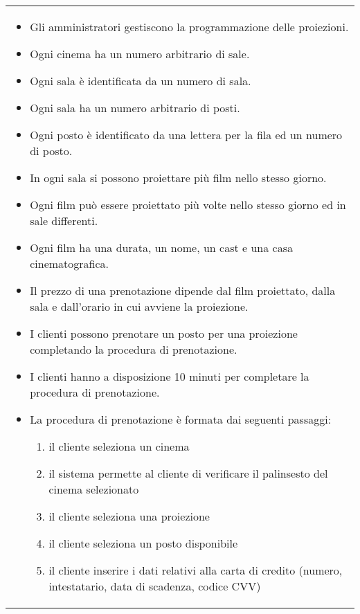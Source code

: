 \begin{tabularx}{\linewidth}{|X|}
    \hline
    \begin{itemize}
        \item Gli amministratori gestiscono la programmazione delle proiezioni.
        \item Ogni cinema ha un numero arbitrario di sale.
        \item Ogni sala è identificata da un numero di sala.
        \item Ogni sala ha un numero arbitrario di posti.
        \item Ogni posto è identificato da una lettera per la fila ed un numero
              di posto.
        \item In ogni sala si possono proiettare più film nello stesso giorno.
        \item Ogni film può essere proiettato più volte nello stesso giorno ed
              in sale differenti.
        \item Ogni film ha una durata, un nome, un cast e una
              casa cinematografica.
        \item Il prezzo di una prenotazione dipende dal film proiettato,
              dalla sala e dall'orario in cui avviene la proiezione.
        \item I clienti possono prenotare un posto per una proiezione
              completando la procedura di prenotazione.
        \item I clienti hanno a disposizione 10 minuti per completare la
              procedura di prenotazione.
        \item La procedura di prenotazione è formata dai seguenti passaggi:
              \begin{enumerate}
                  \item il cliente seleziona un cinema
                  \item il sistema permette al cliente di verificare
                        il palinsesto del cinema selezionato
                  \item il cliente seleziona una proiezione
                  \item il cliente seleziona un posto disponibile
                  \item il cliente inserire i dati relativi alla carta
                        di credito (numero, intestatario, data di scadenza,
                        codice CVV)

\end{enumerate}
\end{itemize}
\end{tabularx}
